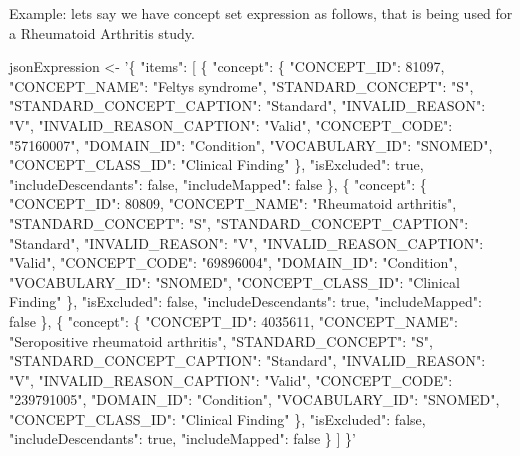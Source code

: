\documentclass[
]{article}
\newenvironment{Shaded}{\begin{snugshade}}{\end{snugshade}}
\newcommand{\NormalTok}[1]{#1}
\newcommand{\StringTok}[1]{\textcolor[rgb]{0.31,0.60,0.02}{#1}}
\begin{document}
Example: lets say we have concept set expression as follows, that is
being used for a Rheumatoid Arthritis study.

\begin{Shaded}
\begin{Highlighting}[]

\NormalTok{jsonExpression <-}\StringTok{ '\{}
\StringTok{  "items": [}
\StringTok{    \{}
\StringTok{      "concept": \{}
\StringTok{        "CONCEPT_ID": 81097,}
\StringTok{        "CONCEPT_NAME": "Feltys syndrome",}
\StringTok{        "STANDARD_CONCEPT": "S",}
\StringTok{        "STANDARD_CONCEPT_CAPTION": "Standard",}
\StringTok{        "INVALID_REASON": "V",}
\StringTok{        "INVALID_REASON_CAPTION": "Valid",}
\StringTok{        "CONCEPT_CODE": "57160007",}
\StringTok{        "DOMAIN_ID": "Condition",}
\StringTok{        "VOCABULARY_ID": "SNOMED",}
\StringTok{        "CONCEPT_CLASS_ID": "Clinical Finding"}
\StringTok{      \},}
\StringTok{      "isExcluded": true,}
\StringTok{      "includeDescendants": false,}
\StringTok{      "includeMapped": false}
\StringTok{    \},}
\StringTok{    \{}
\StringTok{      "concept": \{}
\StringTok{        "CONCEPT_ID": 80809,}
\StringTok{        "CONCEPT_NAME": "Rheumatoid arthritis",}
\StringTok{        "STANDARD_CONCEPT": "S",}
\StringTok{        "STANDARD_CONCEPT_CAPTION": "Standard",}
\StringTok{        "INVALID_REASON": "V",}
\StringTok{        "INVALID_REASON_CAPTION": "Valid",}
\StringTok{        "CONCEPT_CODE": "69896004",}
\StringTok{        "DOMAIN_ID": "Condition",}
\StringTok{        "VOCABULARY_ID": "SNOMED",}
\StringTok{        "CONCEPT_CLASS_ID": "Clinical Finding"}
\StringTok{      \},}
\StringTok{      "isExcluded": false,}
\StringTok{      "includeDescendants": true,}
\StringTok{      "includeMapped": false}
\StringTok{    \},}
\StringTok{    \{}
\StringTok{      "concept": \{}
\StringTok{        "CONCEPT_ID": 4035611,}
\StringTok{        "CONCEPT_NAME": "Seropositive rheumatoid arthritis",}
\StringTok{        "STANDARD_CONCEPT": "S",}
\StringTok{        "STANDARD_CONCEPT_CAPTION": "Standard",}
\StringTok{        "INVALID_REASON": "V",}
\StringTok{        "INVALID_REASON_CAPTION": "Valid",}
\StringTok{        "CONCEPT_CODE": "239791005",}
\StringTok{        "DOMAIN_ID": "Condition",}
\StringTok{        "VOCABULARY_ID": "SNOMED",}
\StringTok{        "CONCEPT_CLASS_ID": "Clinical Finding"}
\StringTok{      \},}
\StringTok{      "isExcluded": false,}
\StringTok{      "includeDescendants": true,}
\StringTok{      "includeMapped": false}
\StringTok{    \}}
\StringTok{  ]}
\StringTok{\}'}
\end{Highlighting}
\end{Shaded}
\end{document}
